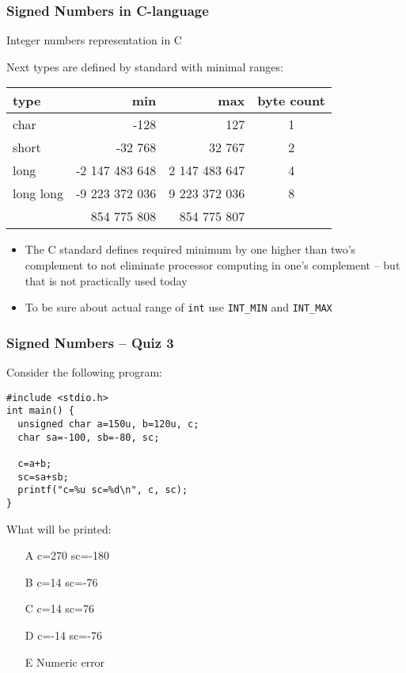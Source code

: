 \documentclass{beamer}
\begin{document}
\begin{frame}
\frametitle{Signed Numbers in C-language}
Integer numbers representation in C

Next types are defined by standard with minimal ranges:
\begin{tabular}{|l|r|r|c|}\hline
type & min & max & byte count\\ \hline
char & -128 & 127 & 1 \\ \hline
short & -32 768 & 32 767 & 2 \\ \hline 
long & -2 147 483 648 & 2 147 483 647 & 4 \\ \hline
long long & -9 223 372 036 & 9 223 372 036  & 8 \\ 
 & \phantom{xx} 854 775 808 & \phantom{xx}854 775 807 &  \\ \hline
\end{tabular}

\begin{itemize}
\item The C standard defines required minimum by one higher than two's complement to not eliminate processor computing in one's complement -- but that is not practically used today
\item To be sure about actual range of \texttt{int} use \texttt{INT\_MIN} and \texttt{INT\_MAX}
\end{itemize}

\end{frame}


\begin{frame}[fragile, shrink=5]
\frametitle{Signed Numbers -- Quiz 3}

Consider the following program:
\begin{verbatim}
#include <stdio.h>
int main() {
  unsigned char a=150u, b=120u, c;
  char sa=-100, sb=-80, sc;
  
  c=a+b;
  sc=sa+sb;
  printf("c=%u sc=%d\n", c, sc);
}
\end{verbatim}

What will be printed:
\begin{itemize}
\item[A] c=270 sc=-180
\item[B] c=14 sc=-76
\item[C] c=14 sc=76
\item[D] c=-14 sc=-76
\item[E] Numeric error
\end{itemize}
\end{frame}
\end{document}
